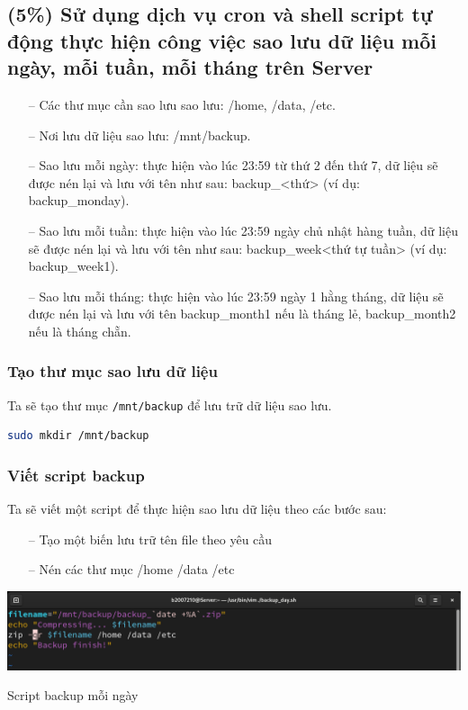 \documentclass[a4paper, 11pt]{article}
\begin{document}
\subsection{(5\%) Sử dụng dịch vụ cron và shell script tự động thực hiện công việc sao lưu dữ liệu mỗi ngày, mỗi tuần, mỗi tháng trên Server}

\begin{itemize}
    \item[--] Các thư mục cần sao lưu sao lưu: /home, /data, /etc.
    \item[--] Nơi lưu dữ liệu sao lưu: /mnt/backup.
    \item[--] Sao lưu mỗi ngày: thực hiện vào lúc 23:59 từ thứ 2 đến thứ 7, dữ liệu sẽ được nén lại và lưu với tên như sau: backup\_<thứ> (ví dụ: backup\_monday).
    \item[--] Sao lưu mỗi tuần: thực hiện vào lúc 23:59 ngày chủ nhật hàng tuần, dữ liệu sẽ được nén lại và lưu với tên như sau: backup\_week<thứ tự tuần> (ví dụ: backup\_week1).
    \item[--] Sao lưu mỗi tháng: thực hiện vào lúc 23:59 ngày 1 hằng tháng, dữ liệu sẽ được nén lại và lưu với tên backup\_month1 nếu là tháng lẻ, backup\_month2 nếu là tháng chẵn.
\end{itemize}

\subsubsection{Tạo thư mục sao lưu dữ liệu}

Ta sẽ tạo thư mục \texttt{/mnt/backup} để lưu trữ dữ liệu sao lưu.

\begin{lstlisting}[language=bash, caption={Tạo thư mục sao lưu dữ liệu}]
sudo mkdir /mnt/backup
\end{lstlisting}

\subsubsection{Viết script backup}

Ta sẽ viết một script để thực hiện sao lưu dữ liệu theo các bước sau:
\begin{itemize}
    \item[--] Tạo một biến lưu trữ tên file theo yêu cầu
    \item[--] Nén các thư mục /home /data /etc
\end{itemize}

\begin{minipage}
    {\linewidth}
    \captionsetup{type=figure}
    \centering
    \includegraphics[width=\linewidth]{images/backup_day.png}
    \caption{Script backup mỗi ngày}
    \label{figure:backup_day}
\end{minipage}
\end{document}
